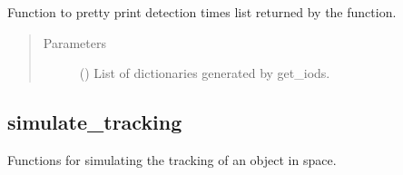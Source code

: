 \documentclass[letterpaper,10pt,english]{sphinxmanual}
\begin{document}

\begin{fulllineitems}
\label{\detokenize{modules/simulate_scan:simulate_scan.plot_scan_for_object}}
\end{fulllineitems}


\begin{fulllineitems}
\label{\detokenize{modules/simulate_scan:simulate_scan.pp_det}}
Function to pretty print detection times list returned by the  function.
\begin{quote}\begin{description}
\item[{Parameters}] \leavevmode
{} () \textendash{} List of dictionaries generated by get\_iods.

\end{description}\end{quote}

\end{fulllineitems}



\subsection{simulate\_tracking}
\label{\detokenize{modules/simulate_tracking:module-simulate_tracking}}\label{\detokenize{modules/simulate_tracking:simulate-tracking}}\label{\detokenize{modules/simulate_tracking::doc}}
Functions for simulating the tracking of an object in space.

\end{document}
